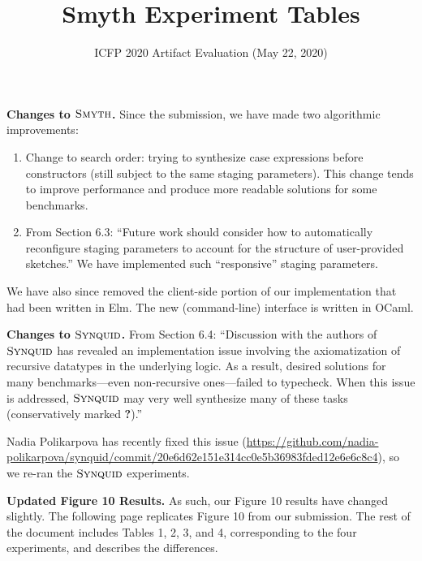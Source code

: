 \documentclass[acmsmall,nonacm]{acmart}
\newcommand{\snsMyth}
  {\ensuremath{\textsc{Smyth}}}
\newcommand{\synquid}
  {\ensuremath{\textsc{Synquid}}}
\begin{document}
\title{Smyth Experiment Tables}
\subtitle{ICFP 2020 Artifact Evaluation (May 22, 2020)}
\maketitle

\textbf{Changes to \snsMyth{}.}
%
Since the submission, we have made two algorithmic improvements:

\begin{enumerate}

\item Change to search order: trying to synthesize case expressions before
constructors (still subject to the same staging parameters). This change tends
to improve performance and produce more readable solutions for some benchmarks.

\item From Section 6.3: ``Future work should consider how to automatically
reconfigure staging parameters to account for the structure of user-provided
sketches.'' We have implemented such ``responsive'' staging parameters.

\end{enumerate}

We have also since removed the client-side portion of our implementation that
had been written in Elm. The new (command-line) interface is written in OCaml.

\vspace{0.30in}
\noindent
\textbf{Changes to \synquid{}.}
%
From Section 6.4: ``Discussion with the authors of \synquid{} has revealed an
implementation issue involving the axiomatization of recursive
datatypes in the underlying logic.
%
As a result, desired solutions for many benchmarks---even non-recursive
ones---failed to typecheck.
%
When this issue is addressed, \synquid{} may very well synthesize many
of these tasks (conservatively marked \textbf{?}).''

Nadia Polikarpova has recently fixed this issue
%
(\url{https://github.com/nadia-polikarpova/synquid/commit/20e6d62e151e314cc0e5b36983fded12e6e6c8c4}),
%
so we re-ran the \synquid{} experiments.


\vspace{0.30in}
\noindent
\textbf{Updated Figure 10 Results.}
%
As such, our Figure 10 results have changed slightly.
%
The following page replicates Figure 10 from our submission.
%
The rest of the document includes Tables 1, 2, 3, and 4, corresponding to the four
experiments, and describes the differences.
\end{document}
